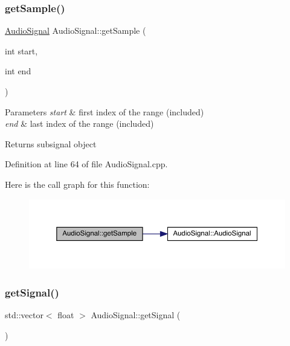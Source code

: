 \subsubsection{\texorpdfstring{get\+Sample()}{getSample()}}
{\footnotesize\ttfamily \hyperlink{class_audio_signal}{Audio\+Signal} Audio\+Signal\+::get\+Sample (\begin{DoxyParamCaption}\item[{int}]{start,  }\item[{int}]{end }\end{DoxyParamCaption})}


\begin{DoxyParams}{Parameters}
{\em start} & first index of the range (included) \\
\hline
{\em end} & last index of the range (included) \\
\hline
\end{DoxyParams}
\begin{DoxyReturn}{Returns}
subsignal object 
\end{DoxyReturn}


Definition at line 64 of file Audio\+Signal.\+cpp.

Here is the call graph for this function\+:
\nopagebreak
\begin{figure}[H]
\begin{center}
\leavevmode
\includegraphics[width=350pt]{class_audio_signal_adfa4565e6ff0d8dc6bcbf87dbf6d01d1_cgraph}
\end{center}
\end{figure}
\mbox{\label{class_audio_signal_aa86d766d3fe58e23a852751bbe2ecc78}} 
\subsubsection{\texorpdfstring{get\+Signal()}{getSignal()}}
{\footnotesize\ttfamily std\+::vector$<$ float $>$ Audio\+Signal\+::get\+Signal (\begin{DoxyParamCaption}{ }\end{DoxyParamCaption})}

